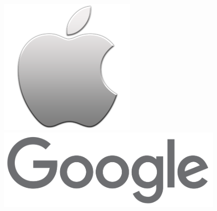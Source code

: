 \documentclass[xcolor=dvipsnames]{beamer}
\begin{document}
\begin{frame}
\begin{figure}
\begin{center}
	\hspace{0.2cm}\includegraphics[scale=0.15]{apple_logo.png}
	\hspace{0.15cm}\includegraphics[scale=0.10]{google.png} 
	\end{center}
	\end{figure}

\end{frame}
\end{document}
